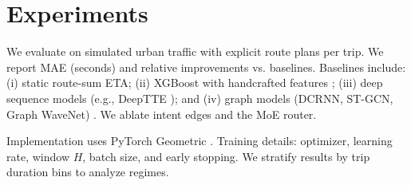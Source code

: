 \section{Experiments}
We evaluate on simulated urban traffic with explicit route plans per trip. We report MAE (seconds) and relative improvements vs. baselines. Baselines include: (i) static route-sum ETA; (ii) XGBoost with handcrafted features \cite{chen2016xgboost}; (iii) deep sequence models (e.g., DeepTTE \cite{wang2018deeptte}); and (iv) graph models (DCRNN, ST-GCN, Graph WaveNet) \cite{li2018dcrnn,yu2018stgcn,wu2019graphwavenet}. We ablate intent edges and the MoE router.

Implementation uses PyTorch Geometric \cite{fey2019pyg}. Training details: optimizer, learning rate, window $H$, batch size, and early stopping. We stratify results by trip duration bins to analyze regimes.
